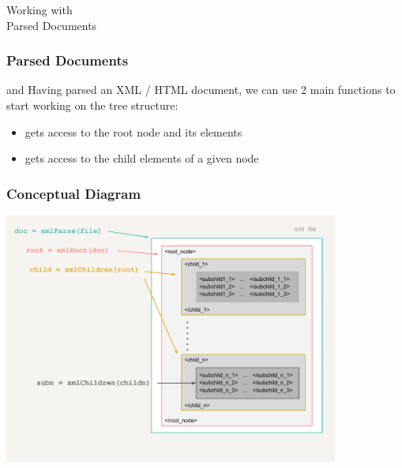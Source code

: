 \documentclass{beamer}\usepackage[]{graphicx}\usepackage[]{color}
\begin{document}

\begin{frame}
 \begin{center}
  {\Huge \textcolor{mandarina}{Working with \\ Parsed Documents}}
 \end{center}
\end{frame}


\begin{frame}
\frametitle{Parsed Documents}

\begin{block}{ and }
Having parsed an XML / HTML document, we can use 2 main functions to start working on the tree structure:
\begin{itemize}
 \item {} gets access to the root node and its elements 
 \item {} gets access to the child elements of a given node
\end{itemize}
\end{block}

\end{frame}


\begin{frame}[fragile]
\frametitle{Conceptual Diagram}

\begin{center}
\includegraphics[width=11cm]{images/xml_tree_navigate.pdf}
\end{center}

\end{frame}
\end{document}

